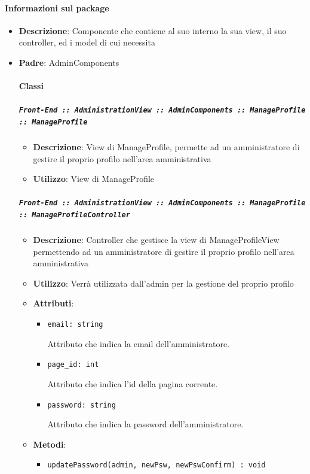 \documentclass[../DefinizioneDiProdotto.tex]{subfiles}
\begin{document}
	\paragraph{Informazioni sul package}\begin{itemize}\item \textbf{Descrizione}: Componente che contiene al suo interno la sua view, il suo controller, ed i model di cui necessita\item \textbf{Padre}: AdminComponents\paragraph{Classi}
	\subparagraph{\texttt{Front-End :: AdministrationView :: AdminComponents :: ManageProfile :: ManageProfile}}
	\begin{itemize}\item \textbf{Descrizione}: View di ManageProfile, permette ad un amministratore di gestire il proprio profilo nell'area amministrativa
	\item \textbf{Utilizzo}: View di ManageProfile
	\end{itemize}\subparagraph{\texttt{Front-End :: AdministrationView :: AdminComponents :: ManageProfile :: ManageProfileController}}
	\begin{itemize}\item \textbf{Descrizione}: Controller che gestisce la view di ManageProfileView permettendo ad un amministratore di gestire il proprio profilo nell'area amministrativa
	\item \textbf{Utilizzo}: Verrà utilizzata dall'admin per la gestione del proprio profilo
	\item \textbf{Attributi}:
	\begin{itemize}
	\item \texttt{email: string}\

	 Attributo che indica la email dell'amministratore.
	\end{itemize}
	\begin{itemize}
	\item \texttt{page\_id: int}\

	 Attributo che indica l'id della pagina corrente.
	\end{itemize}
	\begin{itemize}
	\item \texttt{password: string}\

	 Attributo che indica la password dell'amministratore.
	\end{itemize}
	\item \textbf{Metodi}:
	\begin{itemize}
	\item \texttt{updatePassword(admin, newPsw, newPswConfirm) : void}\


\end{itemize}
\end{itemize}
\end{itemize}
\end{document}
